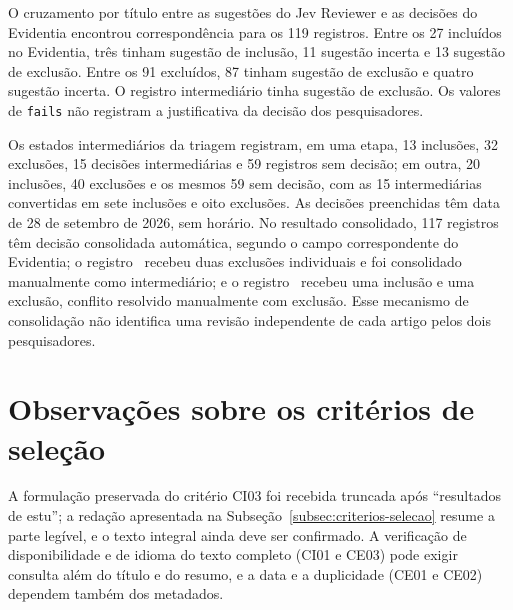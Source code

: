 O cruzamento por título entre as sugestões do Jev Reviewer e as decisões
do Evidentia encontrou correspondência para os 119 registros. Entre os 27
incluídos no Evidentia, três tinham sugestão de inclusão, 11 sugestão
incerta e 13 sugestão de exclusão. Entre os 91 excluídos, 87 tinham
sugestão de exclusão e quatro sugestão incerta. O registro intermediário
tinha sugestão de exclusão. Os valores de \texttt{fails} não registram a
justificativa da decisão dos pesquisadores.

Os estados intermediários da triagem registram, em uma etapa, 13
inclusões, 32 exclusões, 15 decisões intermediárias e 59 registros sem
decisão; em outra, 20 inclusões, 40 exclusões e os mesmos 59 sem decisão,
com as 15 intermediárias convertidas em sete inclusões e oito exclusões.
As decisões preenchidas têm data de 28 de setembro de 2026, sem horário.
No resultado consolidado, 117 registros têm decisão consolidada
automática, segundo o campo correspondente do Evidentia; o registro~
\cite{souza2021} recebeu duas exclusões individuais e foi consolidado
manualmente como intermediário; e o registro~ \cite{baweja2016}
recebeu uma inclusão e uma exclusão, conflito resolvido manualmente com
exclusão. Esse mecanismo de consolidação não identifica uma revisão
independente de cada artigo pelos dois pesquisadores.

\section{Observações sobre os critérios de seleção}

A formulação preservada do critério CI03 foi recebida truncada após
``resultados de estu''; a redação apresentada na
Subseção~\ref{subsec:criterios-selecao} resume a parte legível, e o texto
integral ainda deve ser confirmado. A verificação de disponibilidade e de
idioma do texto completo (CI01 e CE03) pode exigir consulta além do título
e do resumo, e a data e a duplicidade (CE01 e CE02) dependem também dos
metadados.

